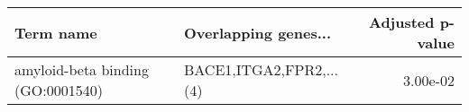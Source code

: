 \begin{tabular}{llr}
\toprule
                        Term name &    Overlapping genes... &  Adjusted p-value \\
\midrule
amyloid-beta binding (GO:0001540) & BACE1,ITGA2,FPR2,...(4) &          3.00e-02 \\
\bottomrule
\end{tabular}
